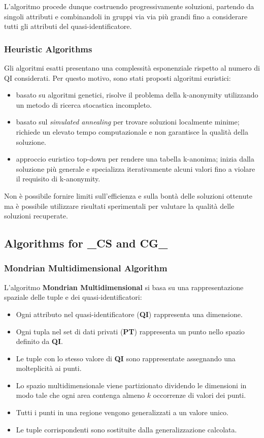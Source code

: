 \documentclass{report}
\begin{document}
\noindent L'algoritmo procede dunque costruendo progressivamente soluzioni, partendo da singoli attributi e combinandoli in gruppi via via più grandi fino a considerare tutti gli attributi del quasi-identificatore.

\subsubsection{Heuristic Algorithms}
Gli algoritmi esatti presentano una complessità esponenziale rispetto al numero di QI considerati. Per questo motivo, sono stati proposti algoritmi euristici:

\begin{itemize}
    \item basato su algoritmi genetici, risolve il problema della k-anonymity utilizzando un metodo di ricerca stocastica incompleto.
    \item basato sul \textit{simulated annealing} per trovare soluzioni localmente minime; richiede un elevato tempo computazionale e non garantisce la qualità della soluzione.
    \item approccio euristico top-down per rendere una tabella k-anonima; inizia dalla soluzione più generale e specializza iterativamente alcuni valori fino a violare il requisito di k-anonymity.
\end{itemize}

\noindent Non è possibile fornire limiti sull'efficienza e sulla bontà delle soluzioni ottenute ma è possibile utilizzare risultati sperimentali per valutare la qualità delle soluzioni recuperate.


\subsection{Algorithms for \textbf{\_CS} and \textbf{CG\_}}

\subsubsection{Mondrian Multidimensional Algorithm}
L'algoritmo \textbf{Mondrian Multidimensional} si basa su una rappresentazione spaziale delle tuple e dei quasi-identificatori:

\begin{itemize}
    \item Ogni attributo nel quasi-identificatore (\textbf{QI}) rappresenta una dimensione.
    \item Ogni tupla nel set di dati privati (\textbf{PT}) rappresenta un punto nello spazio definito da \textbf{QI}.
    \item Le tuple con lo stesso valore di \textbf{QI} sono rappresentate assegnando una molteplicità ai punti.
    \item Lo spazio multidimensionale viene partizionato dividendo le dimensioni in modo tale che ogni area contenga almeno $k$ occorrenze di valori dei punti. 
    \item Tutti i punti in una regione vengono generalizzati a un valore unico.
    \item Le tuple corrispondenti sono sostituite dalla generalizzazione calcolata.
\end{itemize}
\end{document}
